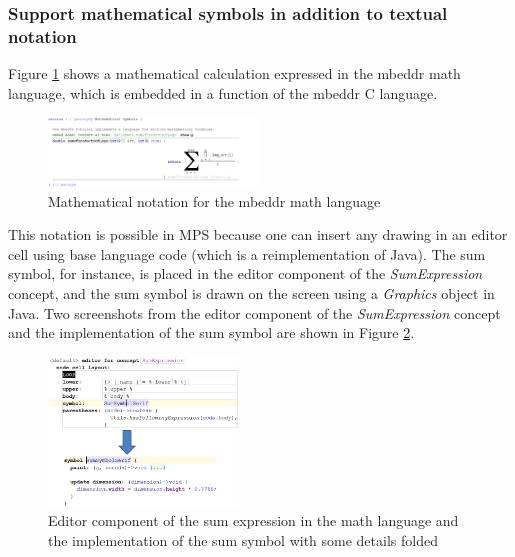 \documentclass[preprint,numbers,10pt]{sigplanconf}
\begin{document}
\subsubsection{Support mathematical symbols in addition to textual notation}
Figure \ref{fig:mathnotation} shows a mathematical calculation expressed in the mbeddr math language, which is embedded in a function of the mbeddr C language.
\begin{figure}[H]
	\centering
	\includegraphics[width=0.50\textwidth]{screens/MathematicalNotation.png}
	\caption{Mathematical notation for the mbeddr math language}
	\label{fig:mathnotation}
\end{figure}

This notation is possible in MPS because one can insert any drawing in an editor cell using base language code (which is a reimplementation of Java).
The sum symbol, for instance, is placed in the editor component of the \emph{SumExpression} concept,
and the sum symbol is drawn on the screen using a \emph{Graphics} object in Java. Two screenshots from
the editor component of the \emph{SumExpression} concept and the implementation of the sum symbol
are shown in Figure \ref{fig:MathSymbolImpl}.

\begin{figure}[H]
	\centering
	\includegraphics[width=0.45\textwidth]{screens/MathSymbolImpl.png}
	\caption{Editor component of the sum expression in the math language and the implementation
of the sum symbol with some details folded}
	\label{fig:MathSymbolImpl}
\end{figure}
\end{document}
